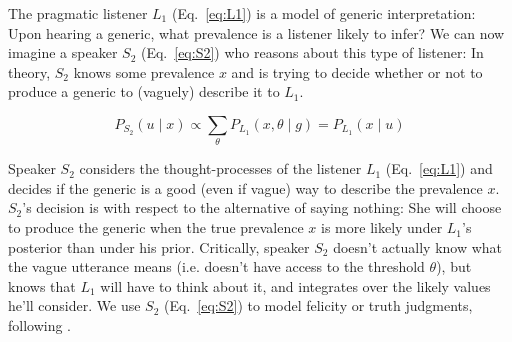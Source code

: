 \documentclass[10pt,letterpaper]{article}
\begin{document}
The pragmatic listener $L_1$ (Eq.~\ref{eq:L1}) is a model of generic interpretation: Upon hearing a generic, what prevalence is a listener likely to infer?
We can now imagine a speaker $S_2$ (Eq.~\ref{eq:S2}) who reasons about this type of listener: In theory, $S_2$ knows some prevalence $x$ and is trying to decide whether or not to produce a generic to (vaguely) describe it to $L_1$.

\begin{equation} 
P_{S_{2}}(u \mid x) \propto  \sum_{\theta} P_{L_{1}}(x , \theta \mid g) =  P_{L_{1}}(x \mid u)
\label{eq:S2}
\end{equation}

Speaker $S_2$ considers the thought-processes of the listener $L_1$ (Eq.~\ref{eq:L1}) and decides if the generic is a good (even if vague) way to describe the prevalence $x$. 
$S_2$'s decision is with respect to the alternative of saying nothing: She will choose to produce the generic when the true prevalence $x$ is more likely under $L_1$'s posterior than under his prior. 
Critically, speaker $S_{2}$ doesn't actually know what the vague utterance means (i.e. doesn't have access to the threshold $\theta$), but knows that $L_{1}$ will have to think about it, and integrates over the likely values he'll consider.
We use $S_{2}$ (Eq.~\ref{eq:S2}) to model felicity or truth judgments, following .
%


%
\end{document}
